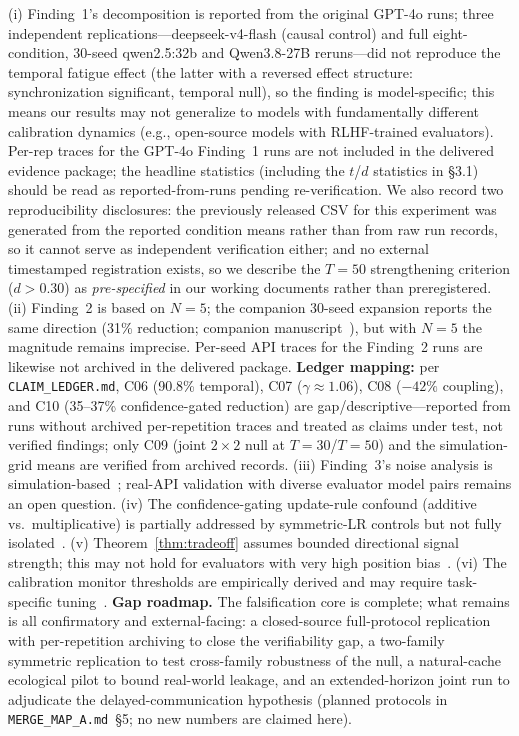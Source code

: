 \documentclass[11pt]{article}
\theoremstyle{definition}
\theoremstyle{remark}
\begin{document}
(i) Finding~1's decomposition is reported from the original GPT-4o runs; three independent replications---deepseek-v4-flash (causal control) and full eight-condition, 30-seed qwen2.5:32b and Qwen3.8-27B reruns---did not reproduce the temporal fatigue effect (the latter with a reversed effect structure: synchronization significant, temporal null), so the finding is model-specific; this means our results may not generalize to models with fundamentally different calibration dynamics (e.g., open-source models with RLHF-trained evaluators). Per-rep traces for the GPT-4o Finding~1 runs are not included in the delivered evidence package; the headline statistics (including the $t$/$d$ statistics in \S3.1) should be read as reported-from-runs pending re-verification. We also record two reproducibility disclosures: the previously released CSV for this experiment was generated from the reported condition means rather than from raw run records, so it cannot serve as independent verification either; and no external timestamped registration exists, so we describe the $T{=}50$ strengthening criterion ($d > 0.30$) as \emph{pre-specified} in our working documents rather than preregistered. (ii) Finding~2 is based on $N{=}5$; the companion 30-seed expansion reports the same direction (31\% reduction; companion manuscript~\citep{companion2026}), but with $N{=}5$ the magnitude remains imprecise. Per-seed API traces for the Finding~2 runs are likewise not archived in the delivered package. \textbf{Ledger mapping:} per \texttt{CLAIM\_LEDGER.md}, C06 (90.8\% temporal), C07 ($\gamma{\approx}1.06$), C08 ($-42\%$ coupling), and C10 (35--37\% confidence-gated reduction) are gap/descriptive---reported from runs without archived per-repetition traces and treated as claims under test, not verified findings; only C09 (joint $2{\times}2$ null at $T{=}30$/$T{=}50$) and the simulation-grid means are verified from archived records. (iii) Finding~3's noise analysis is simulation-based~\citep{resampling2026}; real-API validation with diverse evaluator model pairs remains an open question. (iv) The confidence-gating update-rule confound (additive vs.\ multiplicative) is partially addressed by symmetric-LR controls but not fully isolated~\citep{boundarysync2026}. (v) Theorem~\ref{thm:tradeoff} assumes bounded directional signal strength; this may not hold for evaluators with very high position bias~\citep{tversky1974anchoring}. (vi) The calibration monitor thresholds are empirically derived and may require task-specific tuning~\citep{naeini2015obtaining,jiang2021can}. \textbf{Gap roadmap.} The falsification core is complete; what remains is all confirmatory and external-facing: a closed-source full-protocol replication with per-repetition archiving to close the verifiability gap, a two-family symmetric replication to test cross-family robustness of the null, a natural-cache ecological pilot to bound real-world leakage, and an extended-horizon joint run to adjudicate the delayed-communication hypothesis (planned protocols in \texttt{MERGE\_MAP\_A.md}~\S5; no new numbers are claimed here).
\end{document}

